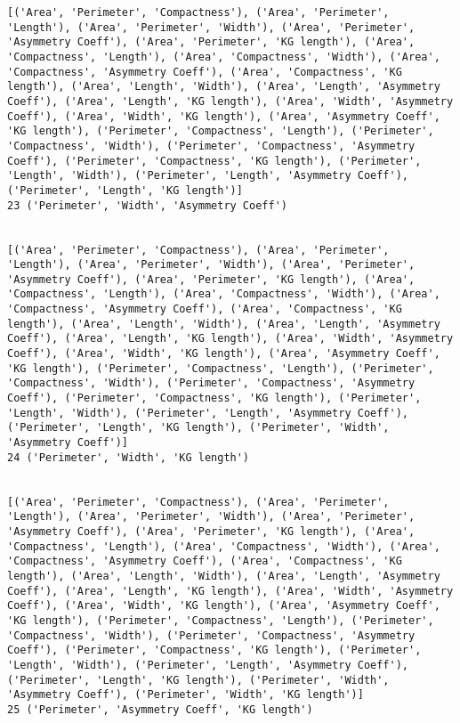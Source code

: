 \documentclass[11pt]{article}
\begin{document}
\begin{Verbatim}[commandchars=\\\{\}]
[('Area', 'Perimeter', 'Compactness'), ('Area', 'Perimeter', 'Length'), ('Area', 'Perimeter', 'Width'), ('Area', 'Perimeter', 'Asymmetry Coeff'), ('Area', 'Perimeter', 'KG length'), ('Area', 'Compactness', 'Length'), ('Area', 'Compactness', 'Width'), ('Area', 'Compactness', 'Asymmetry Coeff'), ('Area', 'Compactness', 'KG length'), ('Area', 'Length', 'Width'), ('Area', 'Length', 'Asymmetry Coeff'), ('Area', 'Length', 'KG length'), ('Area', 'Width', 'Asymmetry Coeff'), ('Area', 'Width', 'KG length'), ('Area', 'Asymmetry Coeff', 'KG length'), ('Perimeter', 'Compactness', 'Length'), ('Perimeter', 'Compactness', 'Width'), ('Perimeter', 'Compactness', 'Asymmetry Coeff'), ('Perimeter', 'Compactness', 'KG length'), ('Perimeter', 'Length', 'Width'), ('Perimeter', 'Length', 'Asymmetry Coeff'), ('Perimeter', 'Length', 'KG length')]
23 ('Perimeter', 'Width', 'Asymmetry Coeff')


[('Area', 'Perimeter', 'Compactness'), ('Area', 'Perimeter', 'Length'), ('Area', 'Perimeter', 'Width'), ('Area', 'Perimeter', 'Asymmetry Coeff'), ('Area', 'Perimeter', 'KG length'), ('Area', 'Compactness', 'Length'), ('Area', 'Compactness', 'Width'), ('Area', 'Compactness', 'Asymmetry Coeff'), ('Area', 'Compactness', 'KG length'), ('Area', 'Length', 'Width'), ('Area', 'Length', 'Asymmetry Coeff'), ('Area', 'Length', 'KG length'), ('Area', 'Width', 'Asymmetry Coeff'), ('Area', 'Width', 'KG length'), ('Area', 'Asymmetry Coeff', 'KG length'), ('Perimeter', 'Compactness', 'Length'), ('Perimeter', 'Compactness', 'Width'), ('Perimeter', 'Compactness', 'Asymmetry Coeff'), ('Perimeter', 'Compactness', 'KG length'), ('Perimeter', 'Length', 'Width'), ('Perimeter', 'Length', 'Asymmetry Coeff'), ('Perimeter', 'Length', 'KG length'), ('Perimeter', 'Width', 'Asymmetry Coeff')]
24 ('Perimeter', 'Width', 'KG length')


[('Area', 'Perimeter', 'Compactness'), ('Area', 'Perimeter', 'Length'), ('Area', 'Perimeter', 'Width'), ('Area', 'Perimeter', 'Asymmetry Coeff'), ('Area', 'Perimeter', 'KG length'), ('Area', 'Compactness', 'Length'), ('Area', 'Compactness', 'Width'), ('Area', 'Compactness', 'Asymmetry Coeff'), ('Area', 'Compactness', 'KG length'), ('Area', 'Length', 'Width'), ('Area', 'Length', 'Asymmetry Coeff'), ('Area', 'Length', 'KG length'), ('Area', 'Width', 'Asymmetry Coeff'), ('Area', 'Width', 'KG length'), ('Area', 'Asymmetry Coeff', 'KG length'), ('Perimeter', 'Compactness', 'Length'), ('Perimeter', 'Compactness', 'Width'), ('Perimeter', 'Compactness', 'Asymmetry Coeff'), ('Perimeter', 'Compactness', 'KG length'), ('Perimeter', 'Length', 'Width'), ('Perimeter', 'Length', 'Asymmetry Coeff'), ('Perimeter', 'Length', 'KG length'), ('Perimeter', 'Width', 'Asymmetry Coeff'), ('Perimeter', 'Width', 'KG length')]
25 ('Perimeter', 'Asymmetry Coeff', 'KG length')



\end{Verbatim}
\end{document}

